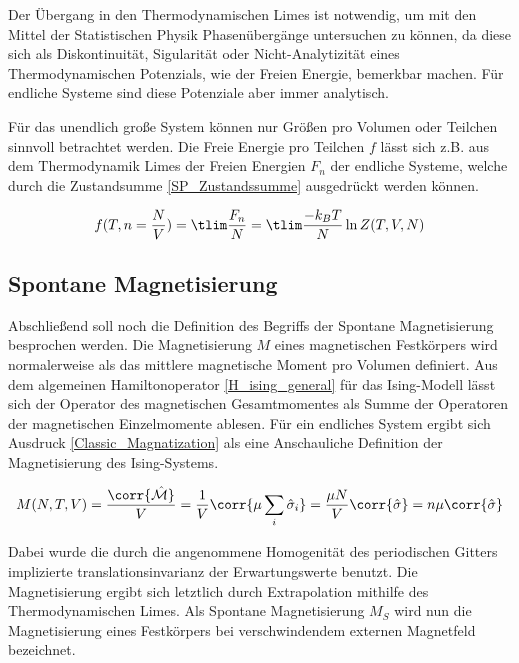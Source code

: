 \noindent Der Übergang in den Thermodynamischen Limes ist notwendig, um mit den Mittel der Statistischen Physik Phasenübergänge untersuchen zu können, da diese sich als Diskontinuität, Sigularität oder Nicht-Analytizität eines Thermodynamischen Potenzials, wie der Freien Energie, bemerkbar machen. Für endliche Systeme sind diese Potenziale aber immer analytisch. 

\noindent Für das unendlich große System können nur Größen pro Volumen oder Teilchen sinnvoll betrachtet werden. Die Freie Energie pro Teilchen $f$ lässt sich z.B. aus dem Thermodynamik Limes der Freien Energien $F_n$ der endliche Systeme, welche durch die Zustandsumme \eqref{SP_Zustandssumme} ausgedrückt werden können. 

\begin{equation} \label{SP_FreieEnergie}
f(T,n = \frac{N}{V}) = \tlim \frac{F_n}{N} = \tlim \frac{-k_B T}{N} \ln Z(T,V,N) 
\end{equation}

\subsection{Spontane Magnetisierung}
Abschließend soll noch die Definition des Begriffs der Spontane Magnetisierung besprochen werden. Die Magnetisierung $M$ eines magnetischen Festkörpers wird normalerweise als das mittlere magnetische Moment pro Volumen definiert. Aus dem algemeinen Hamiltonoperator \eqref{H_ising_general} für das Ising-Modell lässt sich der Operator des magnetischen Gesamtmomentes als Summe der Operatoren der magnetischen Einzelmomente ablesen. Für ein endliches System ergibt sich Ausdruck  \eqref{Classic_Magnatization} als eine Anschauliche Definition der Magnetisierung des Ising-Systems. 

\begin{equation} \label{Classic_Magnatization}
M(N,T,V) =\frac{\corr{\hat{\mathcal{M}}}}{V} = \frac{1}{V}\corr{ \mu\sum_i \hat{\sigma}_i} = \frac{\mu N}{V}\corr{\hat{\sigma}} = n \mu \corr{\hat{\sigma}} 
\end{equation}

\noindent Dabei wurde die durch die angenommene Homogenität des periodischen Gitters implizierte translationsinvarianz der Erwartungswerte benutzt. Die Magnetisierung ergibt sich letztlich durch Extrapolation mithilfe des Thermodynamischen Limes.
Als Spontane Magnetisierung $M_S$ wird nun die Magnetisierung eines Festkörpers bei verschwindendem externen Magnetfeld bezeichnet. 


